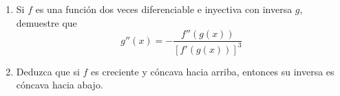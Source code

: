 \item 
\begin{enumerate}
    \item[(a)] Si $f$ es una función dos veces diferenciable e inyectiva con inversa $g$, demuestre que
    $$g''(x) = -\frac{f''(g(x))}{[f'(g(x))]^3}$$
    \item[(b)] Deduzca que si $f$ es creciente y cóncava hacia arriba, entonces su inversa es cóncava hacia abajo.
\end{enumerate}
